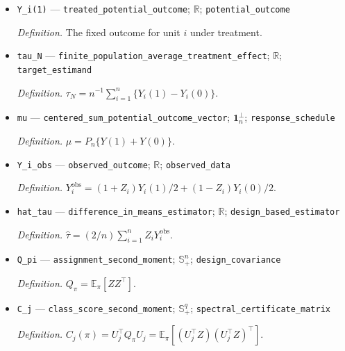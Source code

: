 \documentclass{article}
\begin{document}
\begin{itemize}
  \par\smallskip\noindent\emph{Definition.} The fixed outcome for unit \(i\) under control.
  \item \texttt{Y\_\allowbreak{}i(1)} --- \texttt{treated\_\allowbreak{}potential\_\allowbreak{}outcome}; \(\mathbb R\); \texttt{potential\_\allowbreak{}outcome}
  \par\smallskip\noindent\emph{Definition.} The fixed outcome for unit \(i\) under treatment.
  \item \texttt{tau\_\allowbreak{}N} --- \texttt{finite\_\allowbreak{}population\_\allowbreak{}average\_\allowbreak{}treatment\_\allowbreak{}effect}; \(\mathbb R\); \texttt{target\_\allowbreak{}estimand}
  \par\smallskip\noindent\emph{Definition.} \(\tau_N=n^{-1}\sum_{i=1}^n\{Y_i(1)-Y_i(0)\}\).
  \item \texttt{mu} --- \texttt{centered\_\allowbreak{}sum\_\allowbreak{}potential\_\allowbreak{}outcome\_\allowbreak{}vector}; \(\mathbf 1_n^\perp\); \texttt{response\_\allowbreak{}schedule}
  \par\smallskip\noindent\emph{Definition.} \(\mu=P_n\{Y(1)+Y(0)\}\).
  \item \texttt{Y\_\allowbreak{}i\_\allowbreak{}obs} --- \texttt{observed\_\allowbreak{}outcome}; \(\mathbb R\); \texttt{observed\_\allowbreak{}data}
  \par\smallskip\noindent\emph{Definition.} \(Y_i^{\mathrm{obs}}=(1+Z_i)Y_i(1)/2+(1-Z_i)Y_i(0)/2\).
  \item \texttt{hat\_\allowbreak{}tau} --- \texttt{difference\_\allowbreak{}in\_\allowbreak{}means\_\allowbreak{}estimator}; \(\mathbb R\); \texttt{design\_\allowbreak{}based\_\allowbreak{}estimator}
  \par\smallskip\noindent\emph{Definition.} \(\widehat\tau=(2/n)\sum_{i=1}^nZ_iY_i^{\mathrm{obs}}\).
  \item \texttt{Q\_\allowbreak{}pi} --- \texttt{assignment\_\allowbreak{}second\_\allowbreak{}moment}; \(\mathbb S_+^n\); \texttt{design\_\allowbreak{}covariance}
  \par\smallskip\noindent\emph{Definition.} \(Q_\pi=\mathbb E_\pi[ZZ^\top]\).
  \item \texttt{C\_\allowbreak{}j} --- \texttt{class\_\allowbreak{}score\_\allowbreak{}second\_\allowbreak{}moment}; \(\mathbb S_+^q\); \texttt{spectral\_\allowbreak{}certificate\_\allowbreak{}matrix}
  \par\smallskip\noindent\emph{Definition.} \(C_j(\pi)=U_j^\top Q_\pi U_j=\mathbb E_\pi[(U_j^\top Z)(U_j^\top Z)^\top]\).

\end{itemize}
\end{document}
